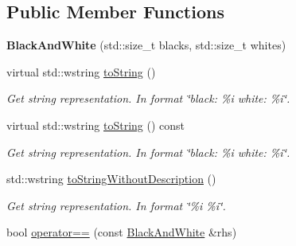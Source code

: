 \subsection*{Public Member Functions}
\begin{DoxyCompactItemize}
\item 
\hypertarget{classmastermind_1_1logic_1_1_black_and_white_a4dbd770b9f1ba3bef45ebba9fc01dcf4}{}\label{classmastermind_1_1logic_1_1_black_and_white_a4dbd770b9f1ba3bef45ebba9fc01dcf4} 
{\bfseries Black\+And\+White} (std\+::size\+\_\+t blacks, std\+::size\+\_\+t whites)
\item 
\hypertarget{classmastermind_1_1logic_1_1_black_and_white_a0eda910b89f90c753b861dff1449347c}{}\label{classmastermind_1_1logic_1_1_black_and_white_a0eda910b89f90c753b861dff1449347c} 
virtual std\+::wstring \hyperlink{classmastermind_1_1logic_1_1_black_and_white_a0eda910b89f90c753b861dff1449347c}{to\+String} ()
\begin{DoxyCompactList}\small\item\em Get string representation. In format \char`\"{}black\+: \%i white\+: \%i\char`\"{}. \end{DoxyCompactList}\item 
\hypertarget{classmastermind_1_1logic_1_1_black_and_white_aaa1108efb71702c9cdf6ac9a9ad4a0c9}{}\label{classmastermind_1_1logic_1_1_black_and_white_aaa1108efb71702c9cdf6ac9a9ad4a0c9} 
virtual std\+::wstring \hyperlink{classmastermind_1_1logic_1_1_black_and_white_aaa1108efb71702c9cdf6ac9a9ad4a0c9}{to\+String} () const
\begin{DoxyCompactList}\small\item\em Get string representation. In format \char`\"{}black\+: \%i white\+: \%i\char`\"{}. \end{DoxyCompactList}\item 
\hypertarget{classmastermind_1_1logic_1_1_black_and_white_a928b0328a8d9c0b5f22a4efe93ecafd8}{}\label{classmastermind_1_1logic_1_1_black_and_white_a928b0328a8d9c0b5f22a4efe93ecafd8} 
std\+::wstring \hyperlink{classmastermind_1_1logic_1_1_black_and_white_a928b0328a8d9c0b5f22a4efe93ecafd8}{to\+String\+Without\+Description} ()
\begin{DoxyCompactList}\small\item\em Get string representation. In format \char`\"{}\%i \%i\char`\"{}. \end{DoxyCompactList}\item 
bool \hyperlink{classmastermind_1_1logic_1_1_black_and_white_a127a6e7852b3d5b7af42d8bb45ac1bfe}{operator==} (const \hyperlink{classmastermind_1_1logic_1_1_black_and_white}{Black\+And\+White} \&rhs)

\end{DoxyCompactItemize}
